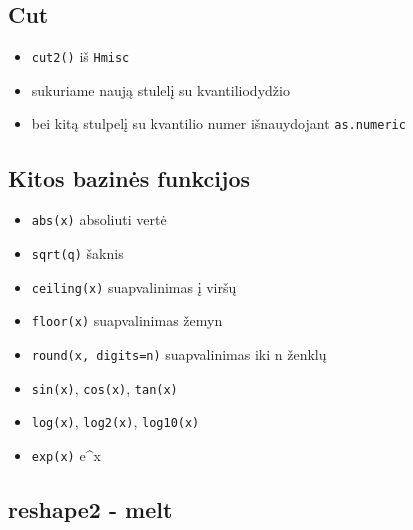 \documentclass[]{article}
\newenvironment{Shaded}{\begin{snugshade}}{\end{snugshade}}
\newcommand{\KeywordTok}[1]{\textcolor[rgb]{0.13,0.29,0.53}{\textbf{#1}}}
\newcommand{\DataTypeTok}[1]{\textcolor[rgb]{0.13,0.29,0.53}{#1}}
\newcommand{\DecValTok}[1]{\textcolor[rgb]{0.00,0.00,0.81}{#1}}
\newcommand{\OperatorTok}[1]{\textcolor[rgb]{0.81,0.36,0.00}{\textbf{#1}}}
\newcommand{\NormalTok}[1]{#1}
\providecommand{\tightlist}{%
  \setlength{\itemsep}{0pt}\setlength{\parskip}{0pt}}
\begin{document}
\subsection{Cut}\label{cut-1}

\begin{itemize}
\tightlist
\item
  \texttt{cut2()} iš \texttt{Hmisc}
\item
  sukuriame naują stulelį su kvantiliodydžio
\item
  bei kitą stulpelį su kvantilio numer išnauydojant \texttt{as.numeric}
\end{itemize}

\begin{Shaded}
\end{Shaded}

\subsection{Kitos bazinės funkcijos}\label{kitos-bazines-funkcijos}

\begin{itemize}
\tightlist
\item
  \texttt{abs(x)} absoliuti vertė
\item
  \texttt{sqrt(q)} šaknis
\item
  \texttt{ceiling(x)} suapvalinimas į viršų
\item
  \texttt{floor(x)} suapvalinimas žemyn
\item
  \texttt{round(x,\ digits=n)} suapvalinimas iki n ženklų
\item
  \texttt{sin(x)}, \texttt{cos(x)}, \texttt{tan(x)}
\item
  \texttt{log(x)}, \texttt{log2(x)}, \texttt{log10(x)}
\item
  \texttt{exp(x)} e\^{}x
\end{itemize}

\subsection{reshape2 - melt}\label{reshape2---melt}
\end{document}
